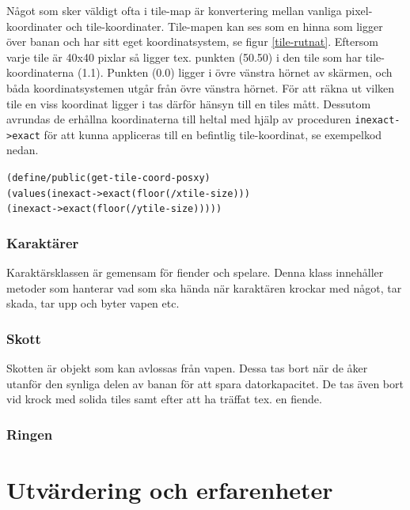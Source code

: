 \documentclass{scrartcl}
\newcommand{\code}[1]%
{\texttt{#1}}
\begin{document}
Något som sker väldigt ofta i tile-map är konvertering mellan vanliga pixel-koordinater och tile-koordinater. Tile-mapen kan ses som en hinna som ligger över banan och har sitt eget koordinatsystem, se figur \ref{tile-rutnat}. Eftersom varje tile är 40x40 pixlar så ligger tex. punkten (50.50) i den tile som har tile-koordinaterna (1.1). Punkten (0.0) ligger i övre vänstra hörnet av skärmen, och båda koordinatsystemen utgår från övre vänstra hörnet. För att räkna ut vilken tile en viss koordinat ligger i tas därför hänsyn till en tiles mått. Dessutom avrundas de erhållna koordinaterna till heltal med hjälp av proceduren \code{inexact->exact} för att kunna appliceras till en befintlig tile-koordinat, se exempelkod nedan. 
\begin{alltt}
(define/public (get-tile-coord-pos x y) 
      (values (inexact->exact (floor (/ x tile-size)))
              (inexact->exact (floor (/ y tile-size)))))
\end{alltt}         


\subsubsection{Karaktärer}

Karaktärsklassen är gemensam för fiender och spelare. Denna klass innehåller metoder som hanterar vad som ska hända när karaktären krockar med något, tar skada, tar upp och byter vapen etc.  

\subsubsection{Skott}

Skotten är objekt som kan avlossas från vapen. Dessa tas bort när de åker utanför den synliga delen av banan för att spara datorkapacitet. De tas även bort vid krock med solida tiles samt efter att ha träffat tex. en fiende. 

\subsubsection{Ringen}

\section{Utvärdering och erfarenheter}

\end{document}
